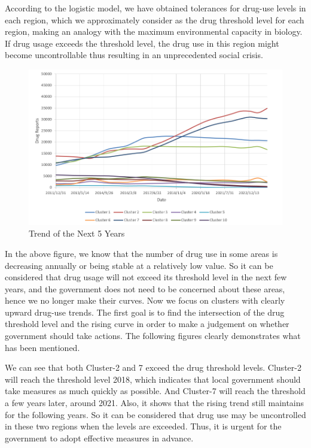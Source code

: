 \documentclass[11pt]{article}
\begin{document}
According to the logistic model, we have obtained tolerances for drug-use levels in each region, which we approximately consider as the drug threshold level for each region, making an analogy with the maximum environmental capacity in biology. If drug usage exceeds the threshold level, the drug use in this region might become uncontrollable thus resulting in an unprecedented social crisis.

\begin{figure}[H]
	\centering
	\includegraphics[scale=0.5]{./figures/5.png}
	\caption{Trend of the Next 5 Years}
	\label{Fig5}
\end{figure}

In the above figure, we know that the number of drug use in some areas is decreasing annually or being stable at a relatively low value. So it can be considered that drug usage will not exceed its threshold level in the next few years, and the government does not need to be concerned about these areas, hence we no longer make their curves. Now we focus on clusters with clearly upward drug-use trends. The first goal is to find the intersection of the drug threshold level and the rising curve in order to make a judgement on whether government should take actions. The following figures clearly demonstrates what has been mentioned.

We can see that both Cluster-2 and 7 exceed the drug threshold levels. Cluster-2 will reach the threshold level 2018, which indicates that local government should take measures as much quickly as possible. And Cluster-7 will reach the threshold a few years later, around 2021. Also, it shows that the rising trend still maintains for the following years. So it can be considered that drug use may be uncontrolled in these two regions when the levels are exceeded. Thus, it is urgent for the government to adopt effective measures in advance.
\end{document}
